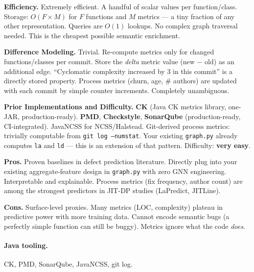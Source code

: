 \documentclass[12pt,a4paper]{article}
\begin{document}
\begin{effbox}
\textbf{Efficiency.}
Extremely efficient. A handful of scalar values per function/class.
Storage: $O(F \times M)$ for $F$ functions and $M$ metrics --- a tiny fraction
of any other representation. Queries are $O(1)$ lookups. No complex graph
traversal needed. This is the cheapest possible semantic enrichment.
\end{effbox}

\begin{diffbox}
\textbf{Difference Modeling.}
Trivial. Re-compute metrics only for changed functions/classes per commit.
Store the \emph{delta} metric value (new $-$ old) as an additional edge.
``Cyclomatic complexity increased by 3 in this commit'' is a directly stored
property. Process metrics (churn, age, \# authors) are updated with each commit
by simple counter increments. Completely unambiguous.
\end{diffbox}

\begin{implbox}
\textbf{Prior Implementations and Difficulty.}
\textbf{CK} (Java CK metrics library, one-JAR, production-ready).
\textbf{PMD}, \textbf{Checkstyle}, \textbf{SonarQube} (production-ready,
CI-integrated). JavaNCSS for NCSS/Halstead. Git-derived process metrics:
trivially computable from \texttt{git log --numstat}. Your existing
\texttt{graph.py} already computes \texttt{la} and \texttt{ld} --- this is
an extension of that pattern. Difficulty: \textbf{very easy}.
\end{implbox}

\begin{prosbox}
\textbf{Pros.}
Proven baselines in defect prediction literature. Directly plug into your
existing aggregate-feature design in \texttt{graph.py} with zero GNN
engineering. Interpretable and explainable. Process metrics (fix frequency,
author count) are among the strongest predictors in JIT-DP studies (LaPredict,
JITLine).
\end{prosbox}

\begin{consbox}
\textbf{Cons.}
Surface-level proxies. Many metrics (LOC, complexity) plateau in predictive
power with more training data. Cannot encode semantic bugs (a perfectly
simple function can still be buggy). Metrics ignore what the code \emph{does}.
\end{consbox}

\paragraph{Java tooling.} CK, PMD, SonarQube, JavaNCSS, git log.
\end{document}
